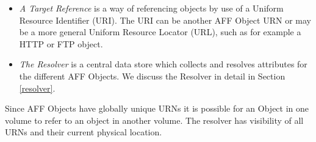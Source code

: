 \documentclass[10pt, conference]{IEEEtran}
\begin{document}
\begin{itemize}



\item \emph{A Target Reference} is a way of referencing objects by use
of a Uniform Resource Identifier (URI). The URI can be another AFF
Object URN or may be a more general Uniform Resource Locator (URL),
such as for example a HTTP or FTP object.

\item \emph{The Resolver} is a central data store which collects and resolves
attributes for the different AFF Objects. We discuss the Resolver in
detail in Section \ref{resolver}.

\end{itemize}

Since AFF Objects have globally unique URNs it is possible for an
Object in one volume to refer to an object in another volume. The
resolver has visibility of all URNs and their current physical
location.


\label{target_reference}

\end{document}
